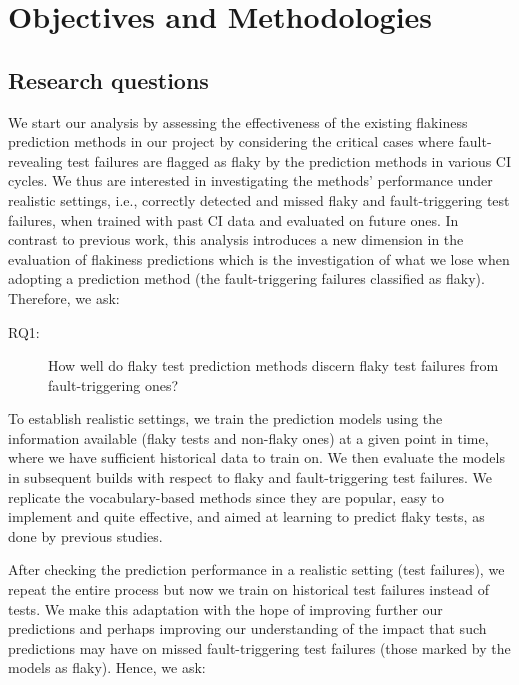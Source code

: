 \section{Objectives and Methodologies}
\label{sec:chromium-objectives}


\subsection{Research questions}

We start our analysis by assessing the effectiveness of the existing flakiness prediction methods in our project by considering the critical cases where fault-revealing test failures are flagged as flaky by the prediction methods in various CI cycles. We thus are interested in investigating the methods' performance under realistic settings, i.e., correctly detected and missed flaky and fault-triggering test failures, when trained with past CI data and evaluated on future ones. In contrast to previous work, this analysis introduces a new dimension in the evaluation of flakiness predictions which is the investigation of what we lose when adopting a prediction method (the fault-triggering failures classified as flaky). Therefore, we ask:

\begin{description}
\item[RQ1:] How well do flaky test prediction methods discern flaky test failures from fault-triggering ones? 
\end{description}

To establish realistic settings, we train the prediction models using the information available (flaky tests and non-flaky ones) at a given point in time, where we have sufficient historical data to train on. We then evaluate the models in subsequent builds with respect to flaky and fault-triggering test failures. 
We replicate the vocabulary-based methods since they are popular, easy to implement and quite effective, and aimed at learning to predict flaky tests, as done by previous studies.

After checking the prediction performance in a realistic setting (test failures), we repeat the entire process but now we train on historical test failures instead of tests. We make this adaptation with the hope of improving further our predictions and perhaps improving our understanding of the impact that such predictions may have on missed fault-triggering test failures (those marked by the models as flaky). Hence, we ask: 

